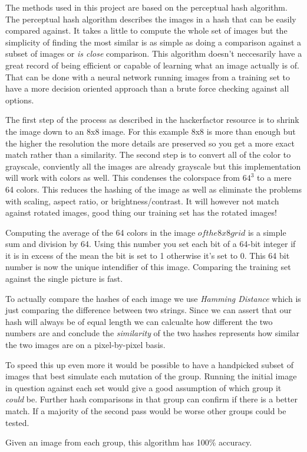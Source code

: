 \documentclass[letter,12pt]{article}
\begin{document}
\pagestyle{headings}

The methods used in this project are based on the perceptual hash algorithm. The perceptual hash algorithm describes the
images in a hash that can be easily compared against. It takes a little to compute the whole set of images but the simplicity
of finding the most similar is as simple as doing a comparison against a subset of images or \textit{is close} comparison. This algorithm
doesn't neccesarily have a great record of being efficient or capable of learning what an image actually is of. That can be
done with a neural network running images from a training set to have a more decision oriented approach than a brute force checking
against all options.

The first step of the process as described in the hackerfactor resource is to shrink the image down to an 8x8 image. For
this example 8x8 is more than enough but the higher the resolution the more details are preserved so you get a more exact
match rather than a similarity. The second step is to convert all of the color to grayscale, conviently all the images are
already grayscale but this implementation will work with colors as well. This condenses the colorspace from $ 64^3 $ to
a mere 64 colors. This reduces the hashing of the image as well as eliminate the problems with scaling, aspect ratio, or
brightness/contrast. It will however not match against rotated images, good thing our training set has the rotated images!

Computing the average of the 64 colors in the image \(of the 8x8 grid\) is a simple sum and division by 64. Using this number
you set each bit of a 64-bit integer if it is in excess of the mean the bit is set to 1 otherwise it's set to 0. This 64 bit
number is now the unique intendifier of this image. Comparing the training set against the single picture is fast.

To actually compare the hashes of each image we use \textit{Hamming Distance} which is just comparing the difference between
two strings. Since we can assert that our hash will always be of equal length we can calcualte how different the two numbers
are and conclude the \textit{similarity} of the two hashes represents how similar the two images are on a pixel-by-pixel basis.

To speed this up even more it would be possible to have a handpicked subset of images that best simulate each mutation of the
group. Running the initial image in question against each set would give a good assumption of which group it \textit{could} be.
Further hash comparisons in that group can confirm if there is a better match. If a majority of the second pass would be worse
other groups could be tested.

Given an image from each group, this algorithm has 100\% accuracy.
\end{document}

